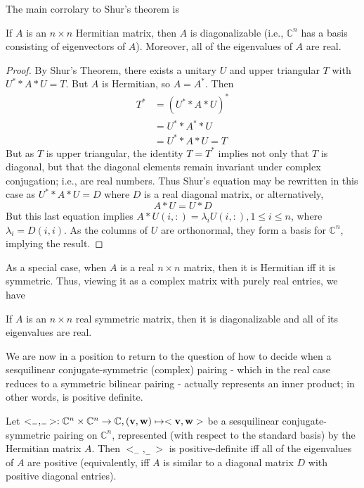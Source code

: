 The main corrolary to Shur's theorem is 

\begin{corollary} If $A$ is an $n\times n$ Hermitian matrix, then $A$ is diagonalizable (i.e., $\mathbb C^n$ has a basis consisting of eigenvectors of $A$). Moreover, all of the eigenvalues of $A$ are real.
\end{corollary}

\begin{proof} By Shur's Theorem, there exists a unitary $U$ and upper triangular $T$ with $U^**A*U = T$. But $A$ is Hermitian, so $A = A^*$. Then
\begin{align*}
T^* &= \left(U^**A*U\right)^*\\
        &= U^**A^**U\\
        &= U^**A*U = T
\end{align*}
But as $T$ is upper triangular, the identity $T = T^*$ implies not only that $T$ is diagonal, but that the diagonal elements remain invariant under complex conjugation; i.e., are real numbers. Thus Shur's equation may be rewritten in this case as $U^**A*U = D$ where $D$ is a real diagonal matrix, or alternatively,
\[
A*U = U*D
\]
But this last equation implies $A*U(i,:) = \lambda_i U(i,:), 1\le i\le n$, where $\lambda_i = D(i,i)$. As the columns of $U$ are orthonormal, they form a basis for $\mathbb C^n$, implying the result.
\end{proof}

As a special case, when $A$ is a real $n\times n$ matrix, then it is Hermitian iff it is symmetric. Thus, viewing it as a complex matrix with purely real entries, we have

\begin{corollary} If $A$ is an $n\times n$ real symmetric matrix, then it is diagonalizable and all of its eigenvalues are real.
\end{corollary}

We are now in a position to return to the question of how to decide when a sesquilinear conjugate-symmetric (complex) pairing - which in the real case reduces to a symmetric bilinear pairing - actually represents an inner product; in other words, is positive definite.

\begin{theorem} Let $<_-,_->:\mathbb C^n\times\mathbb C^n\to \mathbb C, ({\bf v}, {\bf w})\mapsto <{\bf v}, {\bf w}>$ be a sesquilinear conjugate-symmetric pairing on $\mathbb C^n$, represented (with respect to the standard basis) by the Hermitian matrix $A$. Then $<_-,_->$ is positive-definite iff all of the eigenvalues of $A$ are positive (equivalently, iff $A$ is similar to a diagonal matrix $D$ with positive diagonal entries).
\end{theorem}

